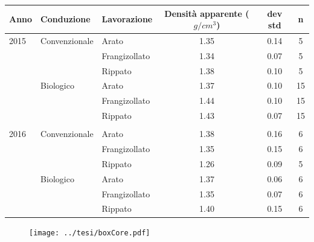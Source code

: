 \documentclass[10pt]{beamer}
\begin{document}
\begin{frame}[label=Core]

  \vspace{1.5cm}
  \hyperlink{finale}{}
  \footnotesize
  \begin{table}[ht]
    \centering
    \begin{tabular}{lllccc}
      \hline
      Anno & Conduzione & Lavorazione & Densit\`a apparente
                                        ($g/cm^3$) & dev std & n \\ 
      \hline
      2015 & Convenzionale & Arato & 1.35 & 0.14 &   5 \\ 
           &               & Frangizollato & 1.34 & 0.07 &   5 \\ 
           &               & Rippato & 1.38 & 0.10 &   5 \\ 
           & Biologico     & Arato & 1.37 & 0.10 &  15 \\ 
           &               & Frangizollato & 1.44 & 0.10 &  15 \\ 
           &               & Rippato & 1.43 & 0.07 &  15 \\ 
      \\
      2016 & Convenzionale & Arato & 1.38 & 0.16 &   6 \\ 
           &               & Frangizollato & 1.35 & 0.15 &   6 \\ 
           &               & Rippato & 1.26 & 0.09 &   5 \\ 
           & Biologico     & Arato & 1.37 & 0.06 &   6 \\ 
           &               & Frangizollato & 1.35 & 0.07 &   6 \\ 
           &               & Rippato & 1.40 & 0.15 &   6 \\ 
      \hline
    \end{tabular}
    \label{tab:RiassuntoDensitaCAmpo}
  \end{table}
\end{frame}


\begin{frame}
  \vspace{1.5cm}
  \begin{figure}
    \texttt{[image: ../tesi/boxCore.pdf]}
  \end{figure}
\end{frame}
\end{document}
